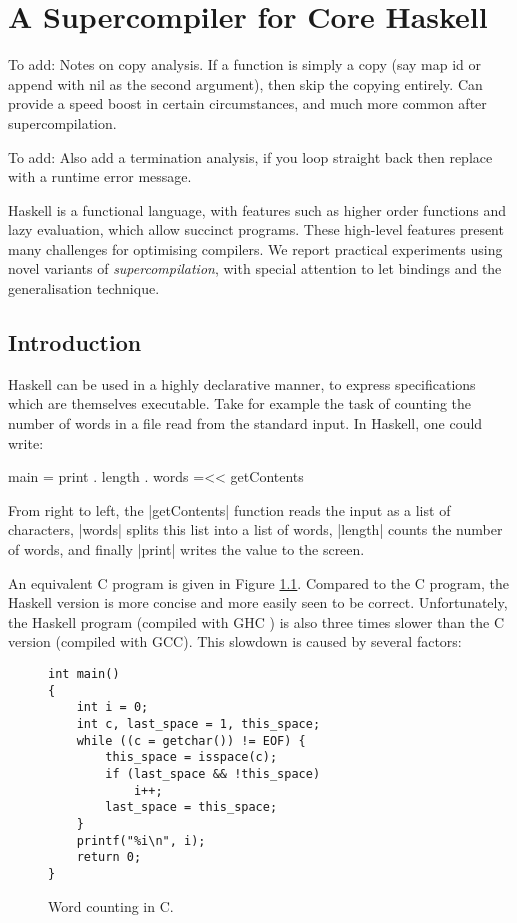 
\chapter{A Supercompiler for Core Haskell}

To add: Notes on copy analysis. If a function is simply a copy (say map id or append with nil as the second argument), then skip the copying entirely. Can provide a speed boost in certain circumstances, and much more common after supercompilation.

To add: Also add a termination analysis, if you loop straight back then replace with a runtime error message.

Haskell is a functional language, with features such as higher order functions and lazy evaluation, which allow succinct programs. These high-level features present many challenges for optimising compilers. We report practical experiments using novel variants of \textit{supercompilation}, with special attention to let bindings and the generalisation technique.

\section{Introduction}

Haskell \cite{haskell} can be used in a highly declarative manner, to express specifications which are themselves executable. Take for example the task of counting the number of words in a file read from the standard input. In Haskell, one could write:

\begin{code}
main = print . length . words =<< getContents
\end{code}

From right to left, the |getContents| function reads the input as a list of characters, |words| splits this list into a list of words, |length| counts the number of words, and finally |print| writes the value to the screen.

An equivalent C program is given in Figure \ref{fig:c_words}. Compared to the C program, the Haskell version is more concise and more easily seen to be correct. Unfortunately, the Haskell program (compiled with GHC \cite{ghc}) is also three times slower than the C version (compiled with GCC). This slowdown is caused by several factors:

\begin{figure}
\begin{verbatim}
int main()
{
	int i = 0;
	int c, last_space = 1, this_space;
	while ((c = getchar()) != EOF) {
		this_space = isspace(c);
		if (last_space && !this_space)
			i++;
		last_space = this_space;
	}
	printf("%i\n", i);
	return 0;
}
\end{verbatim}
\caption{Word counting in C.}
\label{fig:c_words}
\end{figure}

